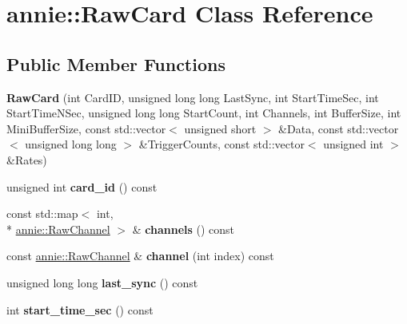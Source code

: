 \hypertarget{classannie_1_1RawCard}{\section{annie\-:\-:Raw\-Card Class Reference}
\label{classannie_1_1RawCard}
}
\subsection*{Public Member Functions}
\begin{DoxyCompactItemize}
\item 
\hypertarget{classannie_1_1RawCard_ab60fad3bbc6ac3ef66759f4436a57413}{{\bfseries Raw\-Card} (int Card\-I\-D, unsigned long long Last\-Sync, int Start\-Time\-Sec, int Start\-Time\-N\-Sec, unsigned long long Start\-Count, int Channels, int Buffer\-Size, int Mini\-Buffer\-Size, const std\-::vector$<$ unsigned short $>$ \&Data, const std\-::vector$<$ unsigned long long $>$ \&Trigger\-Counts, const std\-::vector$<$ unsigned int $>$ \&Rates)}\label{classannie_1_1RawCard_ab60fad3bbc6ac3ef66759f4436a57413}

\item 
\hypertarget{classannie_1_1RawCard_ae80499190a7ce2c3b2b178e9cb2c1aef}{unsigned int {\bfseries card\-\_\-id} () const }\label{classannie_1_1RawCard_ae80499190a7ce2c3b2b178e9cb2c1aef}

\item 
\hypertarget{classannie_1_1RawCard_a1ce186081972d76fe0f291e824f1a6c2}{const std\-::map$<$ int, \\*
\hyperlink{classannie_1_1RawChannel}{annie\-::\-Raw\-Channel} $>$ \& {\bfseries channels} () const }\label{classannie_1_1RawCard_a1ce186081972d76fe0f291e824f1a6c2}

\item 
\hypertarget{classannie_1_1RawCard_aaf7dd447d1038242ca0651fda2570212}{const \hyperlink{classannie_1_1RawChannel}{annie\-::\-Raw\-Channel} \& {\bfseries channel} (int index) const }\label{classannie_1_1RawCard_aaf7dd447d1038242ca0651fda2570212}

\item 
\hypertarget{classannie_1_1RawCard_a897bdf7938f0336e1227169f8ffc5983}{unsigned long long {\bfseries last\-\_\-sync} () const }\label{classannie_1_1RawCard_a897bdf7938f0336e1227169f8ffc5983}

\item 
\hypertarget{classannie_1_1RawCard_a35a59e99e1f3f9bad798edf7722844e7}{int {\bfseries start\-\_\-time\-\_\-sec} () const }\label{classannie_1_1RawCard_a35a59e99e1f3f9bad798edf7722844e7}


\end{DoxyCompactItemize}
